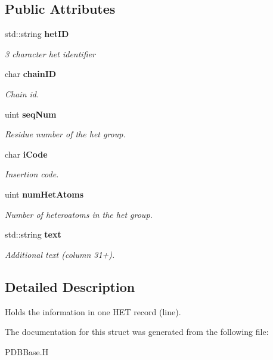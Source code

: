 \subsection*{Public Attributes}
\begin{CompactItemize}
\item 
std::string \bf{het\-ID}\label{structASCbase_1_1PDBBase_1_1het__record__type_38f67500111621ed6aa96f49a1ccc566}

\begin{CompactList}\small\item\em 3 character het identifier \item\end{CompactList}\item 
char \bf{chain\-ID}\label{structASCbase_1_1PDBBase_1_1het__record__type_f375324a95c74d9124203d8a099db88f}

\begin{CompactList}\small\item\em Chain id. \item\end{CompactList}\item 
uint \bf{seq\-Num}\label{structASCbase_1_1PDBBase_1_1het__record__type_7e67fcacb534bfc058abb1f17f495dad}

\begin{CompactList}\small\item\em Residue number of the het group. \item\end{CompactList}\item 
char \bf{i\-Code}\label{structASCbase_1_1PDBBase_1_1het__record__type_e9c3b632888b75ee4aee65efe7b421ab}

\begin{CompactList}\small\item\em Insertion code. \item\end{CompactList}\item 
uint \bf{num\-Het\-Atoms}\label{structASCbase_1_1PDBBase_1_1het__record__type_62ab9f80b81042ccc0e0781c40d6d9be}

\begin{CompactList}\small\item\em Number of heteroatoms in the het group. \item\end{CompactList}\item 
std::string \bf{text}\label{structASCbase_1_1PDBBase_1_1het__record__type_3d9324eb71930e1e35944cd9d9c08f51}

\begin{CompactList}\small\item\em Additional text (column 31+). \item\end{CompactList}\end{CompactItemize}


\subsection{Detailed Description}
Holds the information in one HET record (line). 



The documentation for this struct was generated from the following file:\begin{CompactItemize}
\item 
PDBBase.H\end{CompactItemize}
